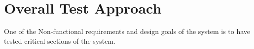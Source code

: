 \section{Overall Test Approach}
One of the Non-functional requirements and design goals of the system is to have tested critical sections of the system.